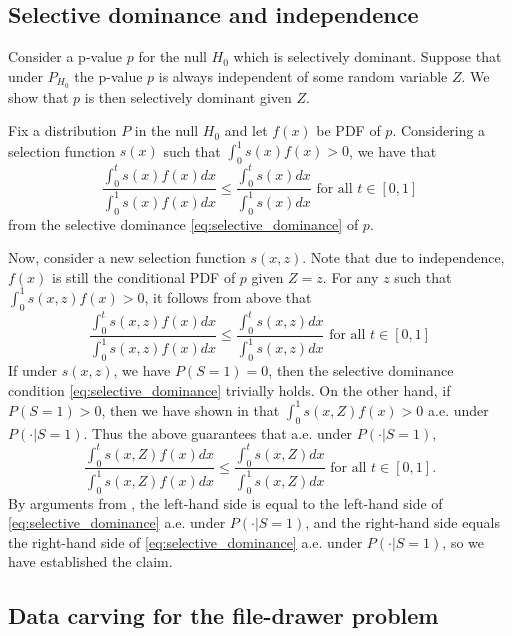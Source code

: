 \documentclass{article}
\begin{document}
\begin{appendix}
\subsection{Selective dominance and independence}
\label{sec:sel_dom_independence}

Consider a p-value $p$ for the null $H_0$ which is selectively dominant. Suppose that under $P_{H_0}$ the p-value $p$ is always independent of some random variable $Z$. We show that $p$ is then selectively dominant given $Z$. 

Fix a distribution $P$ in the null $H_0$ and let $f(x)$ be PDF of $p$. Considering a selection function $s(x)$ such that $\int_0^1 s(x) f(x) > 0$, we have that 
\begin{equation*}
    \frac{\int_0^t s(x) f(x) dx }{\int_0^1 s(x) f(x) dx } \leq  \frac{\int_0^t s(x) dx }{\int_0^1 s(x)dx } \text{ for all } t \in [0, 1]
\end{equation*}
from the selective dominance \eqref{eq:selective_dominance} of $p$. 

Now, consider a new selection function $s(x, z)$. Note that due to independence, $f(x)$ is still the conditional PDF of $p$ given $Z=z$.  For any $z$ such that $\int_0^1 s(x, z) f(x) > 0$, it follows from above that 
\begin{equation*}
    \frac{\int_0^t s(x, z) f(x) dx }{\int_0^1 s(x, z) f(x) dx } \leq  \frac{\int_0^t s(x, z) dx }{\int_0^1 s(x, z)dx } \text{ for all } t \in [0, 1]
\end{equation*}
If under $s(x, z)$, we have $P(S=1) = 0$, then the selective dominance condition \eqref{eq:selective_dominance} trivially holds. On the other hand, if $P(S=1) > 0$, then we have shown in  that $\int_0^1 s(x, Z) f(x) > 0$ a.e. under $P(\cdot | S=1)$. Thus the above guarantees that a.e. under $P(\cdot | S=1)$,
\begin{equation*}
    \frac{\int_0^t s(x, Z) f(x) dx }{\int_0^1 s(x, Z) f(x) dx } \leq  \frac{\int_0^t s(x, Z) dx }{\int_0^1 s(x, Z)dx } \text{ for all } t \in [0, 1].
\end{equation*}
By arguments from , the left-hand side is equal to the left-hand side of \eqref{eq:selective_dominance} a.e. under $P(\cdot | S=1)$, and the right-hand side equals the right-hand side of \eqref{eq:selective_dominance} a.e. under $P(\cdot | S=1)$, so we have established the claim. 


\subsection{Data carving for the file-drawer problem}
\label{sec:carve_appdx}


\end{appendix}
\end{document}
